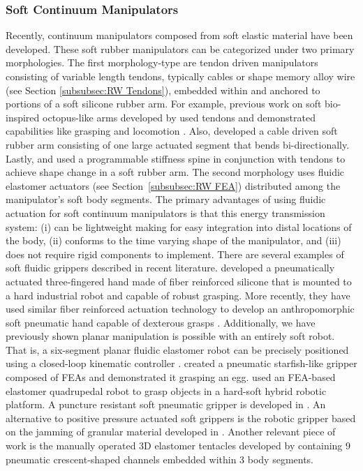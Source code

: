 \subsubsection{Soft Continuum Manipulators}
Recently, continuum manipulators composed from soft elastic material have been developed.
These soft rubber manipulators can be categorized under two primary morphologies.
The first morphology-type are tendon driven manipulators consisting of variable length tendons, typically cables or shape memory alloy wire (see Section \ref{subsubsec:RW Tendons}), embedded within and anchored to portions of a soft silicone rubber arm.
For example, previous work on soft bio-inspired octopus-like arms developed by \citet{calisti2010study} used tendons and demonstrated capabilities like grasping and locomotion \citep{laschi2012soft, calisti2011octopus}.
Also, \citet{wang2013visual} developed a cable driven soft rubber arm consisting of one large actuated segment that bends bi-directionally.
Lastly, \citet{mcevoy14shape} and \citet{mcevoy2014thermoplastic} used a programmable stiffness spine in conjunction with tendons to achieve shape change in a soft rubber arm.
The second morphology uses fluidic elastomer actuators (see Section~\ref{subsubsec:RW FEA}) distributed among the manipulator's soft body segments.
The primary advantages of using fluidic actuation for soft continuum manipulators is that this energy transmission system: (i) can be lightweight making for easy integration into distal locations of the body, (ii) conforms to the time varying shape of the manipulator, and (iii) does not require rigid components to implement.
There are several examples of soft fluidic grippers described in recent literature.
\citet{deimel2013compliant} developed a pneumatically actuated three-fingered hand made of fiber reinforced silicone that is mounted to a hard industrial robot and capable of robust grasping.
More recently, they have used similar fiber reinforced actuation technology to develop an anthropomorphic soft pneumatic hand capable of dexterous grasps \citep{deimel2014novel}.
Additionally, we have previously shown planar manipulation is possible with an entirely soft robot. That is, a six-segment planar fluidic elastomer robot can be precisely positioned using a closed-loop kinematic controller \citep{marchese2014design, marchese2014whole, katzschmann2015autonomous}.
\citet{ilievski2011soft} created a pneumatic starfish-like gripper composed of FEAs and demonstrated it grasping an egg.
\citet{Stokes2014hybrid} used an FEA-based elastomer quadrupedal robot to grasp objects in a hard-soft hybrid robotic platform.
A puncture resistant soft pneumatic gripper is developed in \citet{shepherd2013soft}.
An alternative to positive pressure actuated soft grippers is the robotic gripper based on the jamming of granular material developed in \citet{brown2010universal}.
Another relevant piece of work is the manually operated 3D elastomer tentacles developed by \citet{martinez2013robotic} containing 9 pneumatic crescent-shaped channels embedded within 3 body segments.

